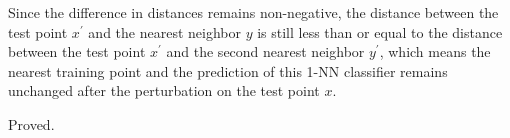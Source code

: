 \documentclass[11pt]{article}
\begin{document}
Since the difference in distances remains non-negative, the distance between the test point $x^\prime$ and the nearest neighbor $y$ is still less than or equal to the distance between the test point $x^\prime$ and the second nearest neighbor $y^\prime$,
which means the nearest training point and the prediction of this 1-NN classifier remains unchanged after the perturbation on the test point $x$.

Proved.
\end{document}
